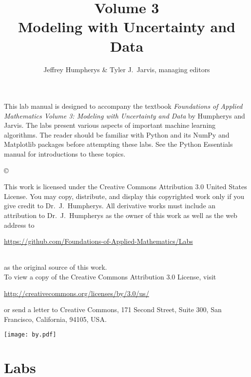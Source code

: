 \documentclass[opener-c,labs,yellow,nociteref]{HJnewsiambook}
\title{Volume 3\\ Modeling with Uncertainty and Data}
\author{Jeffrey Humpherys \& Tyler J.~Jarvis, managing editors}
\begin{document}

\newif\ifbyu
\byufalse %

\thispagestyle{empty} %
\maketitle
\thispagestyle{empty}
\frontmatter



\begin{thepreface} %

This lab manual is designed to accompany the textbook \emph{Foundations of Applied Mathematics Volume 3: Modeling with Uncertainty and Data} by Humpherys and Jarvis.
The labs present various aspects of important machine learning algorithms.
The reader should be familiar with Python \cite{vanrossum2010python} and its NumPy \cite{oliphant2006guide,ascher2001numerical,oliphant2007python} and Matplotlib \cite{Hunter:2007} packages before attempting these labs.
See the Python Essentials manual for introductions to these topics.

\vfill
\copyright{This work is licensed under the Creative Commons Attribution 3.0 United States License.
You may copy, distribute, and display this copyrighted work only if you give credit to Dr.~J.~Humpherys.
All derivative works must include an attribution to Dr.~J.~Humpherys as the owner of this work as well as the web address to
\\
\centerline{\url{https://github.com/Foundations-of-Applied-Mathematics/Labs}}
\\
as the original source of this work.
\\
To view a copy of the Creative Commons Attribution 3.0 License, visit
\\
\centerline{\url{http://creativecommons.org/licenses/by/3.0/us/}}
or send a letter to Creative Commons, 171 Second Street, Suite 300, San Francisco, California, 94105, USA.}

\vfill
\centering\texttt{[image: by.pdf]}
\vfill
\end{thepreface}

\setcounter{tocdepth}{1}
\tableofcontents

\mainmatter %

\part{Labs} %
\end{document}
